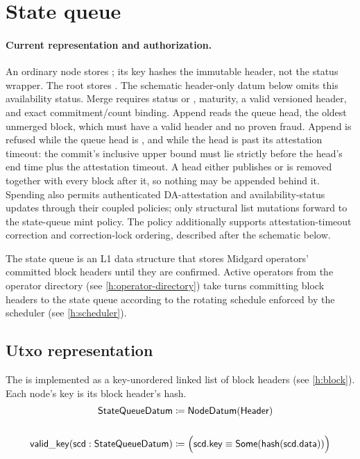 \documentclass[../midgard.tex]{subfiles}
\begin{document}
\section{State queue}
\label{h:state-queue}

\paragraph{Current representation and authorization.}
An ordinary node stores ; its key hashes the immutable header, not the status wrapper.
The root stores .
The schematic header-only datum below omits this availability status.
Merge requires status  or , maturity, a valid versioned header, and exact commitment/count binding.
Append reads the queue head, the oldest unmerged block, which must have a valid header and no proven fraud.
Append is refused while the queue head is , and while the head is  past its attestation timeout: the commit's inclusive upper bound must lie strictly before the head's end time plus the attestation timeout.
A  head either publishes or is removed together with every block after it, so nothing may be appended behind it.
Spending also permits authenticated DA-attestation and availability-status updates through their coupled policies; only structural list mutations forward to the state-queue mint policy.
The policy additionally supports attestation-timeout correction and correction-lock ordering, described after the schematic below.

The state queue is an L1 data structure that stores Midgard operators' committed block headers until they are confirmed.
Active operators from the operator directory (see \cref{h:operator-directory}) take turns committing block headers to the state queue according to the rotating schedule enforced by the scheduler (see \cref{h:scheduler}).

\subsection{Utxo representation}
\label{h:state-queue-utxo-representation}

The  is implemented as a key-unordered linked list of block headers (see \cref{h:block}).
Each  node's key is its block header's hash.
\begin{align*}
    \mathsf{StateQueueDatum} &\coloneq \mathsf{NodeDatum}(\mathsf{Header}) \\ \\
    \mathsf{valid\_key}(\mathsf{scd} : \mathsf{StateQueueDatum}) &\coloneq
        \Bigl( \mathsf{scd.key} \equiv \mathsf{Some}(\mathsf{hash}(\mathsf{scd.data})) \Bigr)
\end{align*}
\end{document}
